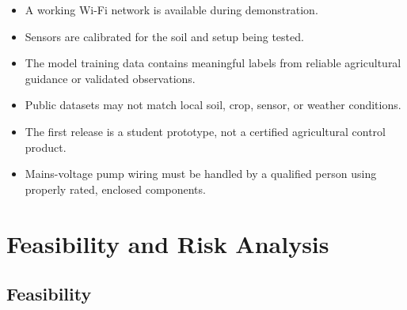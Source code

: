 \documentclass[12pt,a4paper]{report}
\begin{document}
\begin{itemize}[leftmargin=*]

\item A working Wi-Fi network is available during demonstration.

\item Sensors are calibrated for the soil and setup being tested.

\item The model training data contains meaningful labels from reliable agricultural guidance or validated observations.

\item Public datasets may not match local soil, crop, sensor, or weather conditions.

\item The first release is a student prototype, not a certified agricultural control product.

\item Mains-voltage pump wiring must be handled by a qualified person using properly rated, enclosed components.

\end{itemize}

\chapter{Feasibility and Risk Analysis}

\section{Feasibility}
\end{document}
